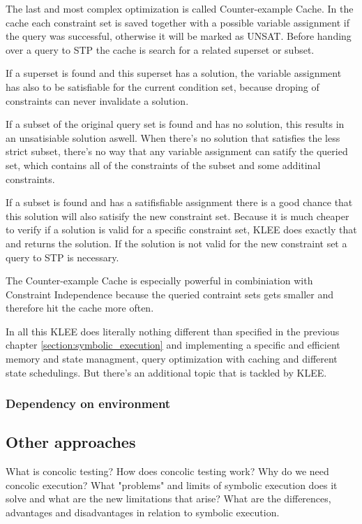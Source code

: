 The last and most complex optimization is called Counter-example Cache. In the cache each constraint set is saved together with a possible variable assignment if the query was successful, otherwise it will be marked as UNSAT. Before handing over a query to STP the cache is search for a related superset or subset.

If a superset is found and this superset has a solution, the variable assignment has also to be satisfiable for the current condition set, because droping of constraints can never invalidate a solution.

If a subset of the original query set is found and has no solution, this results in an unsatisiable solution aswell. When there's no solution that satisfies the less strict subset, there's no way that any variable assignment can satify the queried set, which contains all of the constraints of the subset and some additinal constraints.

If a subset is found and has a satifisfiable assignment there is a good chance that this solution will also satisify the new constraint set. Because it is much cheaper to verify if a solution is valid for a specific constraint set, KLEE does exactly that and returns the solution. If the solution is not valid for the new constraint set a query to STP is necessary.

The Counter-example Cache is especially powerful in combiniation with Constraint Independence because the queried contraint sets gets smaller and therefore hit the cache more often.

In all this KLEE does literally nothing different than specified in the previous chapter \ref{section:symbolic_execution} and implementing a specific and efficient memory and state managment, query optimization with caching and different state schedulings. But there's an additional topic that is tackled by KLEE.
\subsubsection{Dependency on environment}
 


\subsection{Other approaches}
\cite{SurveySymExec-CSUR18}

What is concolic testing? How does concolic testing work? Why do we need concolic execution? What "problems" and limits of symbolic execution does it solve and what are the new limitations that arise?
What are the differences, advantages and disadvantages in relation to symbolic execution.
\cite{Cadar:2006:EAG:1180405.1180445}
\cite{Cadar:2008:KUA:1855741.1855756}
\cite{Cadar:2013:SES:2408776.2408795}
\cite{Godefroid:2005:DDA:1064978.1065036}
\cite{Godefroid:2012:SWF:2090147.2094081}